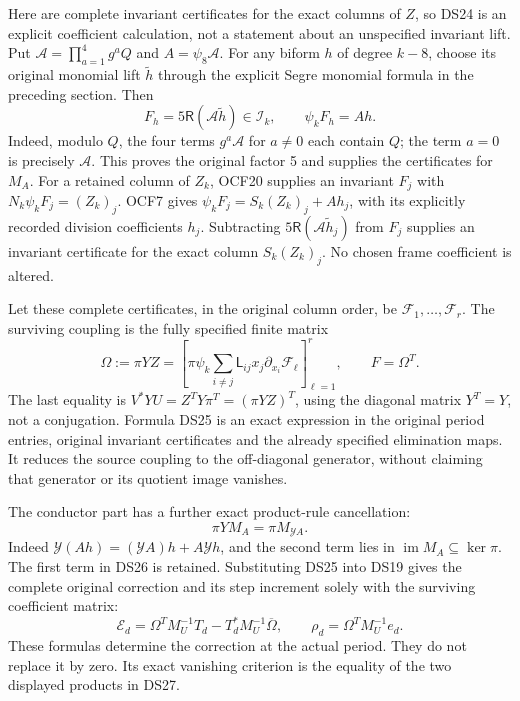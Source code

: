 \documentclass[11pt]{article}
\begin{document}
Here are complete invariant certificates for the exact columns of
\(Z\), so DS24 is an explicit coefficient calculation, not a
statement about an unspecified invariant lift. Put
\(\mathcal A=\prod_{a=1}^4g^aQ\) and
\(A=\psi_8\mathcal A\). For any biform \(h\) of degree \(k-8\),
choose its original monomial lift \(\widetilde h\) through the explicit
Segre monomial formula in the preceding section. Then
\[
F_h=5\mathsf R(\mathcal A\widetilde h)\in\mathscr I_k,
\qquad\psi_kF_h=A h.
\]
Indeed, modulo \(Q\), the four terms \(g^a\mathcal A\) for
\(a\ne0\) each contain \(Q\); the term \(a=0\) is precisely
\(\mathcal A\). This proves the original factor 5 and supplies the
certificates for \(M_A\). For a retained column of \(Z_k\), OCF20
supplies an invariant \(F_j\) with
\(N_k\psi_kF_j=(Z_k)_j\). OCF7 gives
\(\psi_kF_j=S_k(Z_k)_j+A h_j\), with its explicitly recorded
division coefficients \(h_j\). Subtracting
\(5\mathsf R(\mathcal A\widetilde h_j)\) from \(F_j\) supplies
an invariant certificate for the exact column \(S_k(Z_k)_j\).
No chosen frame coefficient is altered.

Let these complete certificates, in the original column order, be
\(\mathcal F_1,\ldots,\mathcal F_r\). The surviving coupling is the
fully specified finite matrix
\begin{equation}\label{dsroot:eq:omega}
\boxed{\Omega:=\pi YZ
=\left[\pi\psi_k
 \sum_{i\ne j}\mathsf L_{ij}x_j\partial_{x_i}\mathcal F_\ell
 \right]_{\ell=1}^r,
\qquad F=\Omega^T.}
\tag{DS25}
\end{equation}
The last equality is \(V^*YU=Z^TY\pi^T=(\pi YZ)^T\), using
the diagonal matrix \(Y^T=Y\), not a conjugation. Formula DS25 is
an exact expression in the original period entries, original invariant
certificates and the already specified elimination maps. It reduces
the source coupling to the off-diagonal generator, without claiming
that generator or its quotient image vanishes.

The conductor part has a further exact product-rule cancellation:
\begin{equation}\label{dsroot:eq:conductor-cancel}
\pi Y M_A=\pi M_{\mathcal Y A}.
\tag{DS26}
\end{equation}
Indeed \(\mathcal Y(Ah)=(\mathcal YA)h+A\mathcal Yh\), and the
second term lies in \(\operatorname{im}M_A\subseteq\ker\pi\).
The first term in DS26 is retained. Substituting DS25 into DS19 gives
the complete original correction and its step increment solely with
the surviving coefficient matrix:
\begin{equation}\label{dsroot:eq:omega-correction}
\mathcal E_d=\Omega^TM_U^{-1}T_d-T_d^*M_U^{-1}\overline\Omega,
\qquad \rho_d=\Omega^TM_U^{-1}e_d.
\tag{DS27}
\end{equation}
These formulas determine the correction at the actual period. They do
not replace it by zero. Its exact vanishing criterion is the equality
of the two displayed products in DS27.
\end{document}
